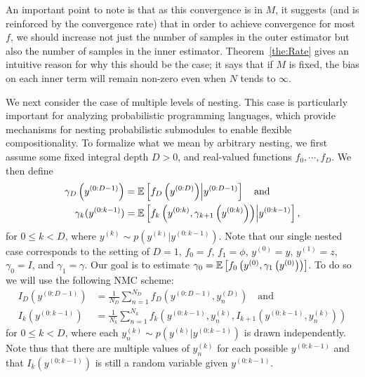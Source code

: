 An important point to note is that as this convergence is in $M$, it suggests (and is reinforced by the convergence rate) 
that in order to achieve convergence for most $f$,
we should increase not just the number of samples in the outer estimator 
but also the number of samples in the inner estimator.
Theorem~\ref{the:Rate} gives an intuitive reason for why this should be the case;
it says that if $M$ is fixed, the bias on each inner term will remain non-zero even when
$N$ tends to $\infty$.
%
%
%

We next consider the case of multiple levels of nesting.
This case is particularly important for analyzing probabilistic programming
languages, which provide mechanisms for nesting probabilistic
submodules to enable flexible compositionality.
To formalize what we mean by arbitrary nesting, we first assume some fixed integral depth
$D > 0$, and real-valued functions $f_0, \cdots, f_D$.
We then define
\begin{align*}
  \gamma_D\left(y^{(0:D-1)}\right) &= \mathbb{E} \left[f_D\left(y^{(0:D)}\right) \middle| y^{(0:D-1)}\right] \quad \text{and} \\
  \gamma_k(y^{(0:k-1)}) &= \mathbb{E} \left[f_k\left(y^{(0:k)}, \gamma_{k+1}\left(y^{(0:k)}\right)\right) \middle| y^{(0:k-1)}\right],
\end{align*}
for $0 \leq k < D$, where $y^{(k)} \sim p\left(y^{(k)}|y^{(0:k-1)}\right)$. 
Note that our single nested case corresponds to the setting of $D=1$, $f_0 = f$, $f_1 = \phi$, $y^{(0)}=y$,
$y^{(1)}=z$, $\gamma_0 = I$, and $\gamma_1 = \gamma$. Our goal is to
estimate $\gamma_0 = \mathbb{E} \left[f_0\left(y^{(0)},
\gamma_1\left(y^{(0)}\right)\right)\right]$. To do so we will use the following NMC scheme:
\begin{align*}
  I_D\left(y^{(0:D-1)}\right) &= \frac{1}{N_D} \sum_{n=1}^{N_D} f_D\left(y^{(0:D-1)}, y^{(D)}_n\right) \quad \text{and} \\
  I_k\left(y^{(0:k-1)}\right) &= \frac{1}{N_k} \sum_{n=1}^{N_k} f_k\left(y^{(0:k-1)}, y^{(k)}_n, I_{k+1}\left(y^{(0:k-1)}, y^{(k)}_n\right)\right)
\end{align*}
for $0 \leq k < D$, where each $y^{(k)}_n \sim p\left(y^{(k)}|y^{(0:k-1)}\right)$ is drawn
independently. Note thus that there are multiple values of $y^{(k)}_n$ for each possible $y^{(0:k-1)}$
and that $I_k\left(y^{(0:k-1)}\right)$ is still a random variable given  $y^{(0:k-1)}$.

